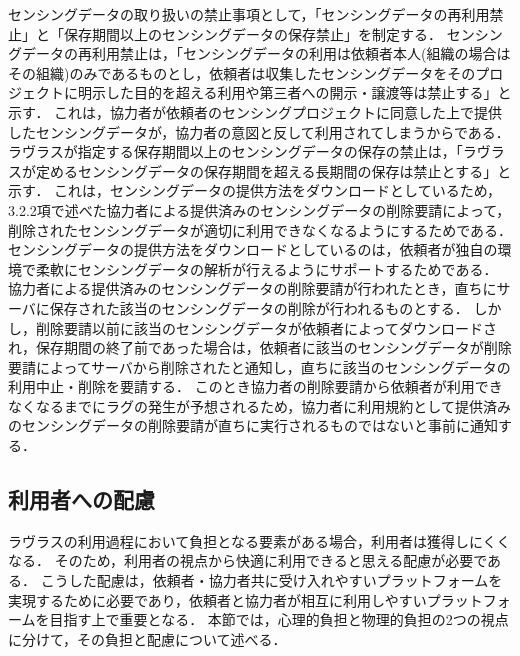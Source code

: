 センシングデータの取り扱いの禁止事項として，「センシングデータの再利用禁止」と「保存期間以上のセンシングデータの保存禁止」を制定する．
センシングデータの再利用禁止は，「センシングデータの利用は依頼者本人(組織の場合はその組織)のみであるものとし，依頼者は収集したセンシングデータをそのプロジェクトに明示した目的を超える利用や第三者への開示・譲渡等は禁止する」と示す．
これは，協力者が依頼者のセンシングプロジェクトに同意した上で提供したセンシングデータが，協力者の意図と反して利用されてしまうからである．
ラヴラスが指定する保存期間以上のセンシングデータの保存の禁止は，「ラヴラスが定めるセンシングデータの保存期間を超える長期間の保存は禁止とする」と示す．
これは，センシングデータの提供方法をダウンロードとしているため，3.2.2項で述べた協力者による提供済みのセンシングデータの削除要請によって，削除されたセンシングデータが適切に利用できなくなるようにするためである．
センシングデータの提供方法をダウンロードとしているのは，依頼者が独自の環境で柔軟にセンシングデータの解析が行えるようにサポートするためである．
協力者による提供済みのセンシングデータの削除要請が行われたとき，直ちにサーバに保存された該当のセンシングデータの削除が行われるものとする．
しかし，削除要請以前に該当のセンシングデータが依頼者によってダウンロードされ，保存期間の終了前であった場合は，依頼者に該当のセンシングデータが削除要請によってサーバから削除されたと通知し，直ちに該当のセンシングデータの利用中止・削除を要請する．
このとき協力者の削除要請から依頼者が利用できなくなるまでにラグの発生が予想されるため，協力者に利用規約として提供済みのセンシングデータの削除要請が直ちに実行されるものではないと事前に通知する．

\subsection{利用者への配慮}
ラヴラスの利用過程において負担となる要素がある場合，利用者は獲得しにくくなる．
そのため，利用者の視点から快適に利用できると思える配慮が必要である．
こうした配慮は，依頼者・協力者共に受け入れやすいプラットフォームを実現するために必要であり，依頼者と協力者が相互に利用しやすいプラットフォームを目指す上で重要となる．
本節では，心理的負担と物理的負担の2つの視点に分けて，その負担と配慮について述べる．

